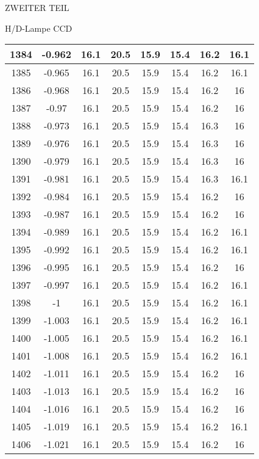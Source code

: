 \begin{appendix}
\begin{chapter}{ZWEITER TEIL}
\begin{section}{H/D-Lampe CCD}
\begin{scriptsize}
\begin{longtable}[htbp]{|c|c|c|c|c|c|c|c|}
            1384 & -0.962 & 16.1 & 20.5 & 15.9 & 15.4 & 16.2 & 16.1 \\ \hline
            1385 & -0.965 & 16.1 & 20.5 & 15.9 & 15.4 & 16.2 & 16.1 \\ \hline
            1386 & -0.968 & 16.1 & 20.5 & 15.9 & 15.4 & 16.2 & 16 \\ \hline
            1387 & -0.97 & 16.1 & 20.5 & 15.9 & 15.4 & 16.2 & 16 \\ \hline
            1388 & -0.973 & 16.1 & 20.5 & 15.9 & 15.4 & 16.3 & 16 \\ \hline
            1389 & -0.976 & 16.1 & 20.5 & 15.9 & 15.4 & 16.3 & 16 \\ \hline
            1390 & -0.979 & 16.1 & 20.5 & 15.9 & 15.4 & 16.3 & 16 \\ \hline
            1391 & -0.981 & 16.1 & 20.5 & 15.9 & 15.4 & 16.3 & 16.1 \\ \hline
            1392 & -0.984 & 16.1 & 20.5 & 15.9 & 15.4 & 16.2 & 16 \\ \hline
            1393 & -0.987 & 16.1 & 20.5 & 15.9 & 15.4 & 16.2 & 16 \\ \hline
            1394 & -0.989 & 16.1 & 20.5 & 15.9 & 15.4 & 16.2 & 16.1 \\ \hline
            1395 & -0.992 & 16.1 & 20.5 & 15.9 & 15.4 & 16.2 & 16.1 \\ \hline
            1396 & -0.995 & 16.1 & 20.5 & 15.9 & 15.4 & 16.2 & 16 \\ \hline
            1397 & -0.997 & 16.1 & 20.5 & 15.9 & 15.4 & 16.2 & 16.1 \\ \hline
            1398 & -1 & 16.1 & 20.5 & 15.9 & 15.4 & 16.2 & 16.1 \\ \hline
            1399 & -1.003 & 16.1 & 20.5 & 15.9 & 15.4 & 16.2 & 16.1 \\ \hline
            1400 & -1.005 & 16.1 & 20.5 & 15.9 & 15.4 & 16.2 & 16.1 \\ \hline
            1401 & -1.008 & 16.1 & 20.5 & 15.9 & 15.4 & 16.2 & 16.1 \\ \hline
            1402 & -1.011 & 16.1 & 20.5 & 15.9 & 15.4 & 16.2 & 16 \\ \hline
            1403 & -1.013 & 16.1 & 20.5 & 15.9 & 15.4 & 16.2 & 16 \\ \hline
            1404 & -1.016 & 16.1 & 20.5 & 15.9 & 15.4 & 16.2 & 16 \\ \hline
            1405 & -1.019 & 16.1 & 20.5 & 15.9 & 15.4 & 16.2 & 16.1 \\ \hline
            1406 & -1.021 & 16.1 & 20.5 & 15.9 & 15.4 & 16.2 & 16 \\ \hline

\end{longtable}
\end{scriptsize}
\end{section}
\end{chapter}
\end{appendix}
